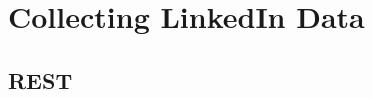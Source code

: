 \documentclass[12pt, oneside, a4paper]{book}
\begin{document}
%
%
%
%
%
%
%
%

\section{Collecting LinkedIn Data}

\subsection{REST}
\end{document}
